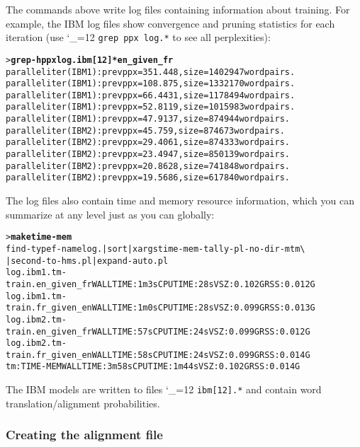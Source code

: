 \documentclass[11pt,letterpaper]{article}
\newcommand{\bs}{\textbackslash{}}
\def\code{\begingroup\catcode`\_=12 \codex}
\newcommand{\codex}[1]{\texttt{#1}\endgroup}
\begin{document}
The commands above write log files containing information about training.  For
example, the IBM log files show convergence and pruning statistics for each
iteration (use \code{grep ppx log.*} to see all perplexities):
\begin{small}
\begin{alltt}
   > \textbf{grep -h ppx log.ibm[12]*en_given_fr}
   parallel iter (IBM1): prev ppx = 351.448, size = 1402947 word pairs.
   parallel iter (IBM1): prev ppx = 108.875, size = 1332170 word pairs.
   parallel iter (IBM1): prev ppx = 66.4431, size = 1178494 word pairs.
   parallel iter (IBM1): prev ppx = 52.8119, size = 1015983 word pairs.
   parallel iter (IBM1): prev ppx = 47.9137, size = 874944 word pairs.
   parallel iter (IBM2): prev ppx = 45.759, size = 874673 word pairs.
   parallel iter (IBM2): prev ppx = 29.4061, size = 874333 word pairs.
   parallel iter (IBM2): prev ppx = 23.4947, size = 850139 word pairs.
   parallel iter (IBM2): prev ppx = 20.8628, size = 741848 word pairs.
   parallel iter (IBM2): prev ppx = 19.5686, size = 617840 word pairs.
\end{alltt}
\end{small}

The log files also contain time and memory resource information, which you can
summarize at any level just as you can globally:
\begin{footnotesize}
\begin{alltt}
   > \textbf{make time-mem}
   find -type f -name log.\* | sort | xargs time-mem-tally-pl -no-dir -m tm \bs
      | second-to-hms.pl | expand-auto.pl
      log.ibm1.tm-train.en_given_fr  WALL TIME: 1m3s   CPU TIME: 28s   VSZ: 0.102G  RSS: 0.012G
      log.ibm1.tm-train.fr_given_en  WALL TIME: 1m0s   CPU TIME: 28s   VSZ: 0.099G  RSS: 0.013G
      log.ibm2.tm-train.en_given_fr  WALL TIME: 57s    CPU TIME: 24s   VSZ: 0.099G  RSS: 0.012G
      log.ibm2.tm-train.fr_given_en  WALL TIME: 58s    CPU TIME: 24s   VSZ: 0.099G  RSS: 0.014G
   tm:TIME-MEM                       WALL TIME: 3m58s  CPU TIME: 1m44s VSZ: 0.102G  RSS: 0.014G
\end{alltt}
\end{footnotesize}

The IBM models are written to files \code{ibm[12].*} and contain word
translation/alignment probabilities.

\subsubsection*{Creating the alignment file}
\end{document}
